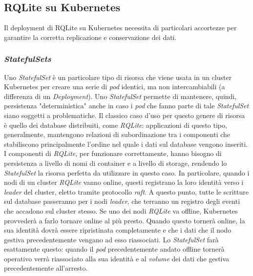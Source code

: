 \subsection{RQLite su Kubernetes}
Il deployment di RQLite su Kubernetes necessita di particolari accortezze per garantire la corretta replicazione e conservazione dei dati.
\newline
\subsubsection{\textit{StatefulSets}}
Uno \textit{StatefulSet} è un particolare tipo di risorsa che viene usata in un cluster Kubernetes per creare una serie di \textit{pod} identici, ma non intercambiabili (a differenza di un \textit{Deployment}).
\newline
Uno \textit{StatefulSet} permette di mantenere, quindi, persistenza "deterministica" anche in caso i \textit{pod} che fanno parte di tale \textit{StatefulSet} siano soggetti a problematiche.
\newline
Il classico caso d'uso per questo genere di risorsa è quello dei database distribuiti, come \textit{RQLite}: applicazioni di questo tipo, generalmente, mantengono relazioni di subordinazione tra i componenti che stabiliscono principalmente l'ordine nel quale i dati sul database vengono inseriti.
\newline
I componenti di \textit{RQLite}, per funzionare correttamente, hanno bisogno di persistenza a livello di nomi di container e a livello di storage, rendendo lo \textit{StatefulSet} la risorsa perfetta da utilizzare in questo caso.
\newline
In particolare, quando i nodi di un cluster \textit{RQLite} vanno online, questi registrano la loro identità verso i \textit{leader} del cluster, eletto tramite protocollo \textit{raft}. A questo punto, tutte le scritture sul database passeranno per i nodi \textit{leader}, che terranno un registro degli eventi che accadono sul cluster stesso.
\newline
Se uno dei nodi \textit{RQLite} va offline, Kubernetes provvederà a farlo tornare online al più presto. Quando questo tornerà online, la sua identità dovrà essere ripristinata completamente e che i dati che il nodo gestiva precedentemente vengano ad esso riassociati. Lo \textit{StatefulSet} farà esattamente questo: quando il \textit{pod} precedentemente andato offline tornerà operativo verrà riassociato alla sua identità e al \textit{volume} dei dati che gestiva precedentemente all'arresto.

